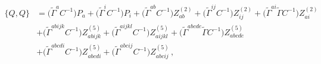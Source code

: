 \begin{equation}
\label{e:QQ-11dbreak}
\begin{aligned}
\{ Q , Q \} &= 
     \big(\tilde{\Gamma}^{a}C^{-1}\big)      P_a 
   + \big(\tilde{\Gamma}^i C^{-1}\big)       P_i 
   + \big(\tilde{\Gamma}^{ab} C^{-1}\big)    Z_{ab}^{(2)} 
   + \big(\tilde{\Gamma}^{ij} C^{-1}\big)    Z_{ij}^{(2)} 
   + \big(\tilde{\Gamma}^{ai} \tilde\Gamma C^{-1}\big)    Z_{ai}^{(2)}\\[1ex]
  &+ \big(\tilde{\Gamma}^{abijk} C^{-1}\big) Z_{abijk}^{(5)} 
   + \big(\tilde{\Gamma}^{aijkl} C^{-1}\big) Z_{aijkl}^{(5)} 
   + \big(\tilde{\Gamma}^{abcde}\tilde\Gamma C^{-1}\big) Z_{abcde}^{(5)} \\[1ex]
  &+ \big(\tilde{\Gamma}^{abcdi} C^{-1}\big) Z_{abcdi}^{(5)} 
   + \big(\tilde{\Gamma}^{abcij} C^{-1}\big) Z_{abcij}^{(5)} \, ,
\end{aligned}
\end{equation}

